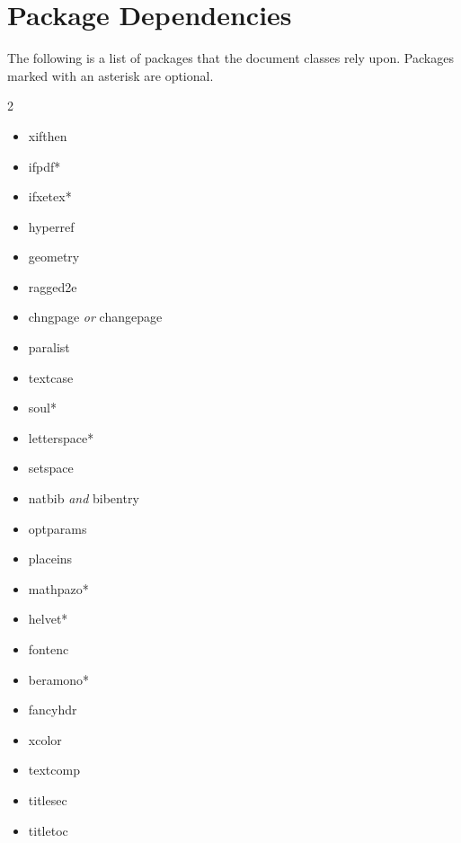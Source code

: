 \section{Package Dependencies}\label{sec:dependencies}
The following is a list of packages that the \TL document
classes rely upon.  Packages marked with an asterisk are optional.
\begin{multicols}{2}
	\begin{itemize}
		\item xifthen
		\item ifpdf*
		\item ifxetex*
		\item hyperref
		\item geometry
		\item ragged2e
		\item chngpage \emph{or} changepage
		\item paralist
		\item textcase
		\item soul*
		\item letterspace*
		\item setspace
		\item natbib \emph{and} bibentry
		\item optparams
		\item placeins
		\item mathpazo*
		\item helvet*
		\item fontenc
		\item beramono*
		\item fancyhdr
		\item xcolor
		\item textcomp
		\item titlesec
		\item titletoc
	\end{itemize}
\end{multicols}
